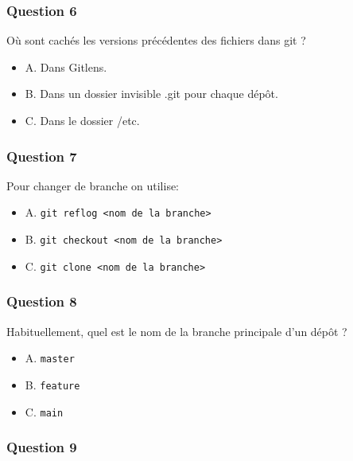 \documentclass[]{article}
\providecommand{\tightlist}{%
  \setlength{\itemsep}{0pt}\setlength{\parskip}{0pt}}
\begin{document}
\hypertarget{question-6}{%
\subsubsection{Question 6}\label{question-6}}

Où sont cachés les versions précédentes des fichiers dans git ?

\begin{itemize}
\tightlist
\item
  A. Dans Gitlens.
\item
  B. Dans un dossier invisible .git pour chaque dépôt.
\item
  C. Dans le dossier /etc.
\end{itemize}

\hypertarget{question-7}{%
\subsubsection{Question 7}\label{question-7}}

Pour changer de branche on utilise:

\begin{itemize}
\tightlist
\item
  A. \texttt{git\ reflog\ \textless{}nom\ de\ la\ branche\textgreater{}}
\item
  B.
  \texttt{git\ checkout\ \textless{}nom\ de\ la\ branche\textgreater{}}
\item
  C. \texttt{git\ clone\ \textless{}nom\ de\ la\ branche\textgreater{}}
\end{itemize}

\hypertarget{question-8}{%
\subsubsection{Question 8}\label{question-8}}

Habituellement, quel est le nom de la branche principale d'un dépôt ?

\begin{itemize}
\tightlist
\item
  A. \texttt{master}
\item
  B. \texttt{feature}
\item
  C. \texttt{main}
\end{itemize}

\hypertarget{question-9}{%
\subsubsection{Question 9}\label{question-9}}
\end{document}
